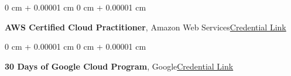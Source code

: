 \documentclass[10pt, a4paper]{article}
\newenvironment{onecolentry}{
    \begin{adjustwidth}{
        0 cm + 0.00001 cm
    }{
        0 cm + 0.00001 cm
    }
}{
    \end{adjustwidth}
} %
\begin{document}
    \begin{onecolentry}
        \textbf{AWS Certified Cloud Practitioner}, Amazon Web Services\hfill \href{https://cp.certmetrics.com/amazon/en/public/verify/credential/21NY0Y6C714E1JSB}{Credential Link}
    \end{onecolentry}
    
    \begin{onecolentry}
        \textbf{30 Days of Google Cloud Program}, Google\hfill \href{https://drive.google.com/file/d/131IwLvWr8a6YWLYd5ILZ6kvacsKfmkWc/view}{Credential Link}
    \end{onecolentry}
    
\end{document}
